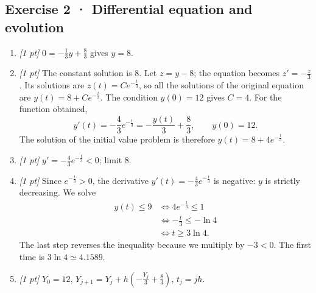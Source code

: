 \subsection*{Exercise 2 · Differential equation and evolution}\begin{enumerate}

\item \textit{[1 pt]} $0=-\frac{1}{3}y+\frac{8}{3}$ gives $y=8$.

\item \textit{[1 pt]} The constant solution is $8$. Let $z=y-8$; the equation becomes $z'=-\frac{z}{3}$. Its solutions are $z(t)=Ce^{-\frac{t}{3}}$, so all the solutions of the original equation are $y(t)=8+Ce^{-\frac{t}{3}}$.
The condition $y(0)=12$ gives $C=4$. For the function obtained,
\[y'(t)=-\frac{4}{3}e^{-\frac{t}{3}}=-\frac{y(t)}{3}+\frac{8}{3},\qquad y(0)=12.\]
The solution of the initial value problem is therefore $y(t)=8+4e^{-\frac{t}{3}}$.

\item \textit{[1 pt]} $y'=-\frac{4}{3}e^{-\frac{t}{3}}<0$; limit $8$.

\item \textit{[1 pt]} Since $e^{-\frac{t}{3}}>0$, the derivative $y'(t)=-\frac{4}{3}e^{-\frac{t}{3}}$ is negative: $y$ is strictly decreasing. We solve
\[\begin{aligned}y(t)\le 9&\Longleftrightarrow 4e^{-\frac{t}{3}}\le1\\&\Longleftrightarrow -\frac{t}{3}\le-\ln 4\\&\Longleftrightarrow t\ge 3\ln 4.\end{aligned}\]
The last step reverses the inequality because we multiply by $-3<0$. The first time is $3\ln 4\simeq4.1589$.

\item \textit{[1 pt]} $Y_0=12$, $Y_{j+1}=Y_j+h(-\frac{Y_j}{3}+\frac{8}{3})$, $t_j=jh$.

\end{enumerate}

